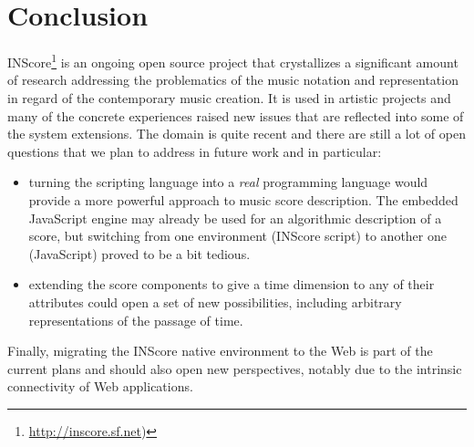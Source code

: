 \documentclass[11pt,a4paper]{article}
\begin{document}
\section{Conclusion}

INScore\footnote{\url{http://inscore.sf.net})} is an ongoing open source project 
that crystallizes a significant amount of research addressing the problematics of the music notation and representation in regard of the contemporary music creation. It is used in artistic projects and many of the concrete experiences raised new issues that are reflected into some of the system extensions. The domain is quite recent and there are still a lot of open questions that we plan to address in future work and in particular: 
\begin{itemize}
\item turning the scripting language into a \emph{real} programming language would provide a more powerful approach to music score description. The embedded JavaScript engine may already be used for an algorithmic description of a score, but switching from one environment (INScore script) to another one (JavaScript) proved to be a bit tedious.
\item extending the score components to give a time dimension to any of their attributes could open a set of new possibilities, including arbitrary representations of the passage of time.
\end{itemize}
Finally, migrating the INScore native environment to the Web is part of the current plans and should also open new perspectives, notably due to the intrinsic connectivity of Web applications.


\balance


\end{document}
